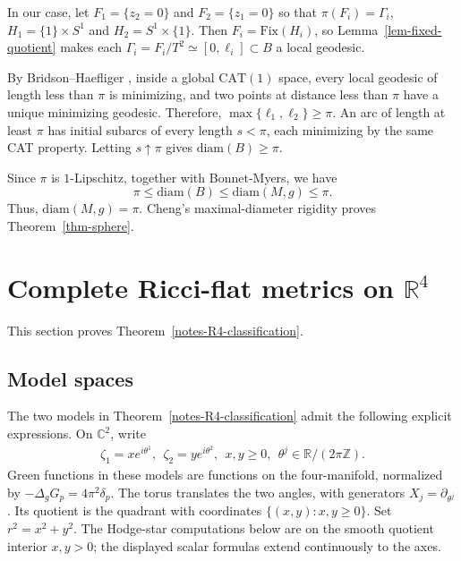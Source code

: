 \documentclass[letterpaper]{amsart}
\theoremstyle{definition}
\theoremstyle{remark}
\begin{document}
In our case, let $F_1= \{z_2=0\} $ and $F_2= \{ z_1=0\} $ so that $\pi (F_i) = \Gamma _i$, $H_1 = \{1\} \times S^1$ and $H_2= S^1 \times \{1\}$. Then $F_i=\mathrm{Fix}(H_i)$, so Lemma~\ref{lem-fixed-quotient} makes each $\Gamma_i=F_i/T^2\simeq[0,\ell_i]\subset B$ a local geodesic. 

By Bridson--Haefliger \cite[Proposition II.1.4]{notes-BH}, inside a global $\mathrm{CAT}(1)$ space, every local geodesic of length less than $\pi $ is minimizing, and two points at distance less than $\pi $ have a unique minimizing geodesic. Therefore, $\max \{ \ell_1, \ell_2 \} \geq \pi $. An arc of length at least $\pi$ has initial subarcs of every length $s<\pi$, each minimizing by the same CAT property. Letting $s\uparrow\pi$ gives $\mathrm{diam}(B)\ge\pi$.

Since $\pi $ is $1$-Lipschitz, together with Bonnet-Myers, we have 
$$\pi \leq \mathrm{diam}(B) \leq \mathrm{diam}(M, g) \leq \pi .$$
Thus, $\mathrm{diam}(M,g)=\pi$. Cheng's maximal-diameter rigidity \cite{notes-Cheng} proves Theorem~\ref{thm-sphere}.

\section{\texorpdfstring{Complete Ricci-flat metrics on $\mathbb R^4$}{Complete Ricci-flat metrics on R4}}\label{sec-R4}
This section proves Theorem~\ref{notes-R4-classification}.

\subsection{Model spaces}
The two models in Theorem~\ref{notes-R4-classification} admit the following explicit expressions. On $\mathbb C^2$, write
\begin{align*}
	\zeta _1 = x e ^{i \theta ^1},\ \  \zeta _2 = y e ^{i \theta ^2},\ \  x, y \geq 0,\ \ \theta ^{j} \in \mathbb{R} / (2 \pi \mathbb{Z}).
\end{align*} 
Green functions in these models are functions on the four-manifold, normalized by $-\Delta_gG_p=4\pi^2\delta_p$. The torus translates the two angles, with generators $X_j = \partial _{\theta ^{j}}$. Its quotient is the quadrant with coordinates $\{(x, y): x, y \geq 0 \}$. Set $r^2=x^2+y^2$. The Hodge-star computations below are on the smooth quotient interior $x,y>0$; the displayed scalar formulas extend continuously to the axes.
\end{document}
